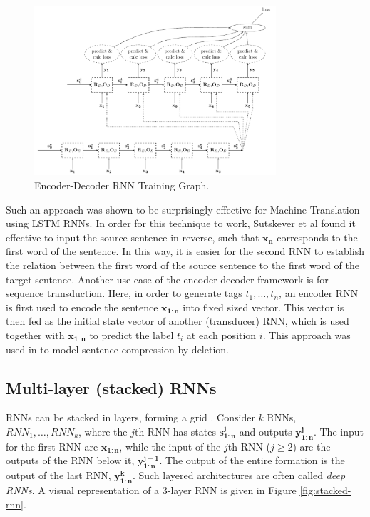 \documentclass[jair,twoside,11pt,theapa]{article}
\newcommand{\m}[1]{\mathbf{#1}}%
\newcommand{\ygcomment}[1]{\textbf{[TODO: #1]}}
\renewcommand{\ygcomment}[1]{}
\begin{document}
{\begin{figure}[h!]
    \begin{center}
    \includegraphics[width=0.8\textwidth]{encdec-rnn2.pdf} 
    \end{center}
    \caption{Encoder-Decoder RNN Training Graph.}
    \label{fig:encdec-rnn}
\end{figure}

Such an
approach was shown to be surprisingly effective for Machine Translation
\cite{sutskever2014sequence} using LSTM RNNs.  In order for this technique to work,
Sutskever et al found it effective to input the source sentence in reverse,
such that $\m{x_n}$ corresponds to the first word of the sentence. In this way,
it is easier for the second RNN to establish the relation between the first word
of the source sentence to the first word of the target sentence.
Another use-case of the encoder-decoder framework is for sequence transduction.
Here, in order to generate tags $t_1,\ldots,t_n$, an encoder RNN is first used
to encode the sentence $\m{x_{1:n}}$ into fixed sized vector. This vector is then fed as the
initial state vector of another (transducer) RNN, which is used together with $\m{x_{1:n}}$
to predict the label $t_i$ at each position $i$.  This approach was used in
\cite{filippova2015sentence} to model sentence compression by deletion.
\ygcomment{@@improve paragraph}


\subsection{Multi-layer (stacked) RNNs} RNNs can be stacked in layers, forming a
grid \cite{hihi1996hierarchical}.  Consider $k$ RNNs, $RNN_1,\ldots,RNN_k$,
where the $j$th RNN has states $\m{s_{1:n}^j}$ and outputs $\m{y_{1:n}^j}$. 
The input for the first RNN are $\m{x_{1:n}}$, while the input of the
$j$th RNN ($j \geq 2$) are the outputs of the RNN below it, $\m{y_{1:n}^{j-1}}$.
The output of the entire formation is the output of the last RNN,
$\m{y_{1:n}^k}$.  
Such layered architectures are often called \emph{deep RNNs}. A visual
representation of a 3-layer RNN is given in Figure \ref{fig:stacked-rnn}.

}
\end{document}
